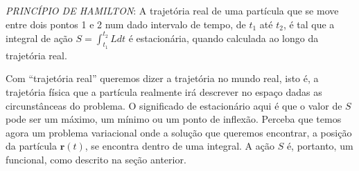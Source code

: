 \documentclass{article}
\begin{document}
\vspace{0.5cm}

\noindent\textit{PRINCÍPIO DE HAMILTON}: A trajetória real de uma partícula que se move entre dois pontos 1 e 2 num dado intervalo de tempo, de $t_1$ até $t_2$, é tal que a integral de ação $S = \int_{t_1}^{t_2}Ldt$ é estacionária, quando calculada ao longo da trajetória real. 

\vspace{0.5cm}

\noindent Com  ``trajetória real'' queremos dizer a trajetória no mundo real, isto é, a trajetória física que a partícula realmente irá descrever no espaço dadas as circunstânceas do problema. O significado de estacionário aqui é que o valor de $S$ pode ser um máximo, um mínimo ou um ponto de inflexão. Perceba que temos agora um problema variacional onde a solução que queremos encontrar, a posição da partícula $\mathbf{r}(t)$, se encontra dentro de uma integral. A ação $S$ é, portanto, um funcional, como descrito na seção anterior.
\end{document}
